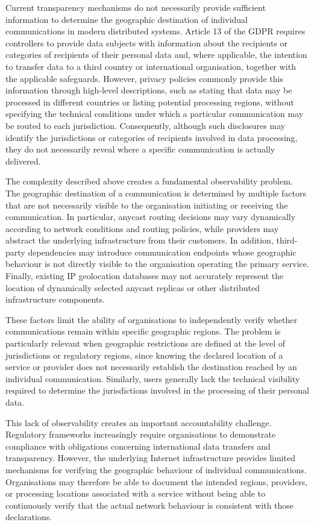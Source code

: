 \documentclass[
A4paper,                %
twoside,                %
openright,              %
chapterprefix=true,     %
12pt,                   %
headings=normal,        %
titlepage=on            %
]{book}
\begin{document}
Current transparency mechanisms do not necessarily provide sufficient information to determine the geographic destination of individual communications in modern distributed systems. Article 13 of the GDPR requires controllers to provide data subjects with information about the recipients or categories of recipients of their personal data and, where applicable, the intention to transfer data to a third country or international organisation, together with the applicable safeguards. However, privacy policies commonly provide this information through high-level descriptions, such as stating that data may be processed in different countries or listing potential processing regions, without specifying the technical conditions under which a particular communication may be routed to each jurisdiction. Consequently, although such disclosures may identify the jurisdictions or categories of recipients involved in data processing, they do not necessarily reveal where a specific communication is actually delivered.

The complexity described above creates a fundamental observability problem. The geographic destination of a communication is determined by multiple factors that are not necessarily visible to the organisation initiating or receiving the communication. In particular, anycast routing decisions may vary dynamically according to network conditions and routing policies, while providers may abstract the underlying infrastructure from their customers. In addition, third-party dependencies may introduce communication endpoints whose geographic behaviour is not directly visible to the organisation operating the primary service. Finally, existing IP geolocation databases may not accurately represent the location of dynamically selected anycast replicas or other distributed infrastructure components.

These factors limit the ability of organisations to independently verify whether communications remain within specific geographic regions. The problem is particularly relevant when geographic restrictions are defined at the level of jurisdictions or regulatory regions, since knowing the declared location of a service or provider does not necessarily establish the destination reached by an individual communication. Similarly, users generally lack the technical visibility required to determine the jurisdictions involved in the processing of their personal data.

This lack of observability creates an important accountability challenge. Regulatory frameworks increasingly require organisations to demonstrate compliance with obligations concerning international data transfers and transparency. However, the underlying Internet infrastructure provides limited mechanisms for verifying the geographic behaviour of individual communications. Organisations may therefore be able to document the intended regions, providers, or processing locations associated with a service without being able to continuously verify that the actual network behaviour is consistent with those declarations.
\end{document}
